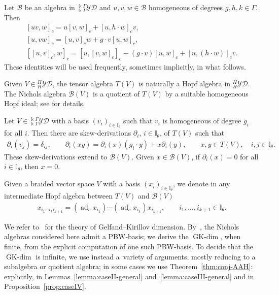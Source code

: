\documentclass[10pt,a4paper]{amsart}
\numberwithin{equation}{section}
\newcommand{\adc}{\operatorname{ad}_c}
\newcommand{\GK}{\operatorname{GK-dim}}
\newcommand{\toba}{\mathscr B}
\newcommand{\I}{{\mathbb I}}
\newcommand{\yd}[1]{{}_{#1}^{#1}\mathcal{YD}}
\begin{document}
\begin{Remark}%
Let
$\toba$ be an algebra in $\yd{\Bbbk \Gamma}$ and $u,v,w\in\toba$ homogeneous of degrees $g,h,k\in\Gamma$. Then
\begin{gather}\label{eq:graded-bracket-derivation1}
[uv,w]_c = u[v,w]_c + [u,h\cdot w]_c v,
\\
\label{eq:graded-bracket-derivation2}
[u,vw]_c = [u,v]_c w + g\cdot v [u,w]_c,
\\
\label{eq:graded-bracket-jacobi}
[[u,v]_c,w]_c = [u,[v,w]_c]_c -(g\cdot v)[u,w]_c +[u,(h\cdot w)]_c v.
\end{gather}
These identities will be used frequently, sometimes implicitly, in what follows.
\end{Remark}

Given $V \in \yd{H}$, the tensor algebra $T(V)$ is naturally a Hopf algebra in $\yd{H}$.
The Nichols algebra $\toba(V)$ is a quotient of $T(V)$ by a suitable homogeneous Hopf ideal; see \cite{A-leyva} for details.

Let $V\in\yd{\Bbbk \Gamma}$ with a basis $(v_i)_{i\in \I_\theta}$ such that $v_i$ is homogeneous of degree $g_i$ for all $i$.
Then there are skew-derivations $\partial_i$, $i\in \I_{\theta}$, of $T(V)$ such that
\begin{align*}%
\partial _i(v_j) =\delta _{ij},\qquad
\partial _i(xy) = \partial _i(x)(g_i\cdot y)+x\partial _i(y),\qquad
x,y\in T(V), \quad i, j \in \I_{\theta}.
\end{align*}
These skew-derivations extend to $\toba(V)$. Given $x\in \toba(V)$, if
$\partial _i(x) = 0$ for all $i\in \I_\theta$, then $x=0$.

Given a braided vector space $V$ with a basis $(x_i)_{i\in\I_{\theta}}$, we denote in any intermediate Hopf algebra between $T(V)$ and $\toba(V)$
\begin{align*}%
x_{i_1\cdots i_k i_{k+1}}= (\adc x_{i_1}) \cdots (\adc x_{i_k})x_{i_{k+1}},\qquad i_1,\ldots,i_{k+1}\in\I_{\theta}.
\end{align*}

We refer to~\cite{KL} for the theory of Gelfand--Kirillov dimension.
By~\cite{Ufer}, the Nichols algebras considered here admit a PBW-basis; we derive the $\GK$, when finite, from
the explicit computation of one such PBW-basis. To decide that the $\GK$ is infinite, we use instead a~variety of arguments, mostly
reducing to a subalgebra or quotient algebra; in some cases we use Theorem~\ref{thm:conj-AAH}:
explicitly, in Lemmas~\ref{lemma:caseII-general} and~\ref{lemma:caseIII-general}
and in Proposition~\ref{prop:caseIV}.
\end{document}
